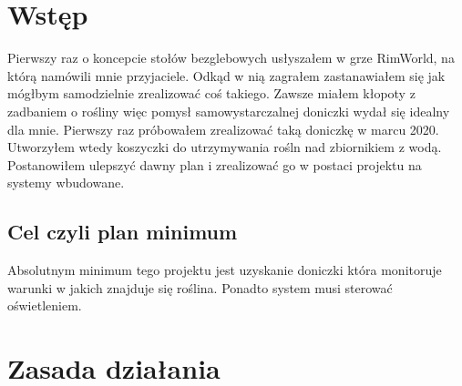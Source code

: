 \documentclass[a4paper,11pt]{uzreport}
\author{Mikołaj Mosoń
\\ 
\texttt{100324@stud.uz.zgora.pl} }
\date{17/01/2021}
\begin{document}
  \maketitle
  \clearpage


	\footnotesize
	\tableofcontents
	  \clearpage

\section{Wstęp}

Pierwszy raz o koncepcie stołów bezglebowych usłyszałem w grze RimWorld, na którą namówili mnie przyjaciele. Odkąd w nią zagrałem zastanawiałem się jak mógłbym samodzielnie zrealizować coś takiego. Zawsze miałem kłopoty z zadbaniem o rośliny więc pomysł samowystarczalnej doniczki wydał się idealny dla mnie.
Pierwszy raz próbowałem zrealizować taką doniczkę w marcu 2020. Utworzyłem wtedy koszyczki do utrzymywania rośln nad zbiornikiem z wodą. Postanowiłem ulepszyć dawny plan i zrealizować go w postaci projektu na systemy wbudowane.
\subsection{Cel czyli plan minimum}
Absolutnym minimum tego projektu jest uzyskanie doniczki która monitoruje warunki w jakich znajduje się roślina. Ponadto system musi sterować oświetleniem.
\section{Zasada działania}
\end{document}
